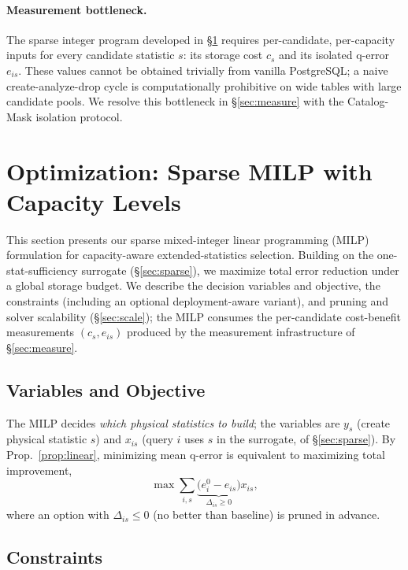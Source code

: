 \documentclass[sigconf, nonacm]{acmart}
\begin{document}
\paragraph{Measurement bottleneck.}
The sparse integer program developed in \S\ref{sec:milp} requires
per-candidate, per-capacity inputs for every candidate statistic $s$: its
storage cost $c_s$ and its isolated q-error $e_{is}$. These values cannot be
obtained trivially from vanilla PostgreSQL; a naive create-analyze-drop cycle is
computationally prohibitive on wide tables with large candidate pools. We
resolve this bottleneck in \S\ref{sec:measure} with the Catalog-Mask isolation
protocol.

\section{Optimization: Sparse MILP with Capacity Levels}
\label{sec:milp}

This section presents our sparse mixed-integer linear programming (MILP)
formulation for capacity-aware extended-statistics selection. Building on the
one-stat-sufficiency surrogate (\S\ref{sec:sparse}), we maximize total error
reduction under a global storage budget. We describe the decision variables and
objective, the constraints (including an optional deployment-aware variant),
and pruning and solver scalability (\S\ref{sec:scale}); the MILP consumes the
per-candidate cost-benefit measurements $(c_s,e_{is})$ produced by the
measurement infrastructure of \S\ref{sec:measure}.

\subsection{Variables and Objective}

The MILP decides \emph{which physical statistics to build}; the variables are
$y_s$ (create physical statistic $s$) and $x_{is}$ (query $i$ uses $s$ in the
surrogate, of \S\ref{sec:sparse}). By Prop.~\ref{prop:linear}, minimizing mean
q-error is equivalent to maximizing total improvement,
\[
  \max \sum_{i,s}\underbrace{\big(e_i^0-e_{is}\big)}_{\Delta_{is}\ge 0}x_{is},
\]
where an option with $\Delta_{is}\le 0$ (no better than baseline) is pruned in
advance.

\subsection{Constraints}
\end{document}
